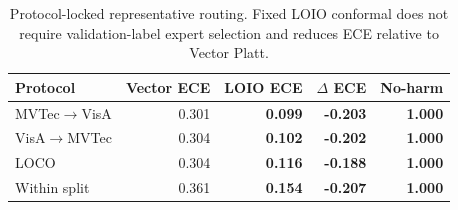 \begin{table}[t]
\centering
\caption{Protocol-locked representative routing. Fixed LOIO conformal does not require validation-label expert selection and reduces ECE relative to Vector Platt.}
\label{tab:protocol-routing}
\footnotesize
\begin{tabular}{lrrrr}
\toprule
Protocol & Vector ECE & LOIO ECE & $\Delta$ ECE & No-harm \\
\midrule
MVTec$\rightarrow$VisA & 0.301 & \textbf{0.099} & \textbf{-0.203} & \textbf{1.000} \\
VisA$\rightarrow$MVTec & 0.304 & \textbf{0.102} & \textbf{-0.202} & \textbf{1.000} \\
LOCO & 0.304 & \textbf{0.116} & \textbf{-0.188} & \textbf{1.000} \\
Within split & 0.361 & \textbf{0.154} & \textbf{-0.207} & \textbf{1.000} \\
\bottomrule
\end{tabular}
\end{table}
